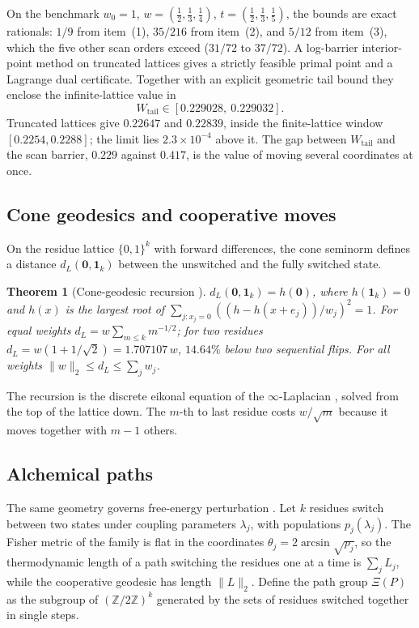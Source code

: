 \documentclass[11pt,reqno]{amsart}
\theoremstyle{plain}
\newtheorem{theorem}{Theorem}[section]
\theoremstyle{definition}
\theoremstyle{remark}
\numberwithin{equation}{section}
\newcommand{\Z}{\mathbb{Z}}
\newcommand{\Wtail}{W_{\mathrm{tail}}}
\begin{document}
On the benchmark $w_0=1$, $w=(\tfrac12,\tfrac13,\tfrac14)$, $t=(\tfrac12,\tfrac13,\tfrac15)$, the bounds are exact rationals: $1/9$ from item~(1), $35/216$ from item~(2), and $5/12$ from item~(3), which the five other scan orders exceed ($31/72$ to $37/72$). A log-barrier interior-point method on truncated lattices gives a strictly feasible primal point and a Lagrange dual certificate. Together with an explicit geometric tail bound they enclose the infinite-lattice value in
\[
\Wtail\in[0.229028,\ 0.229032].
\]
Truncated lattices give $0.22647$ and $0.22839$, inside the finite-lattice window $[0.2254,0.2288]$; the limit lies $2.3\times10^{-4}$ above it. The gap between $\Wtail$ and the scan barrier, $0.229$ against $0.417$, is the value of moving several coordinates at once.

\subsection*{Cone geodesics and cooperative moves}
On the residue lattice $\{0,1\}^k$ with forward differences, the cone seminorm defines a distance $d_L(\mathbf0,\mathbf1_k)$ between the unswitched and the fully switched state.

\begin{theorem}[Cone-geodesic recursion \cite{ChenChen2026VI}]\label{thm:cone}
$d_L(\mathbf0,\mathbf1_k)=h(\mathbf0)$, where $h(\mathbf1_k)=0$ and $h(x)$ is the largest root of $\sum_{j:x_j=0}((h-h(x+e_j))/w_j)^2=1$. For equal weights $d_L=w\sum_{m\le k}m^{-1/2}$; for two residues $d_L=w(1+1/\sqrt2)=1.707107\,w$, $14.64\%$ below two sequential flips. For all weights $\|w\|_2\le d_L\le\sum_jw_j$.
\end{theorem}

The recursion is the discrete eikonal equation of the $\infty$-Laplacian \cite{PSSW2009}, solved from the top of the lattice down. The $m$-th to last residue costs $w/\sqrt m$ because it moves together with $m-1$ others.

\subsection*{Alchemical paths}
The same geometry governs free-energy perturbation \cite{Zwanzig1954}. Let $k$ residues switch between two states under coupling parameters $\lambda_j$, with populations $p_j(\lambda_j)$. The Fisher metric of the family is flat in the coordinates $\theta_j=2\arcsin\sqrt{p_j}$, so the thermodynamic length \cite{Crooks2007,SivakCrooks2012} of a path switching the residues one at a time is $\sum_jL_j$, while the cooperative geodesic has length $\|L\|_2$. Define the path group $\Xi(P)$ as the subgroup of $(\Z/2\Z)^k$ generated by the sets of residues switched together in single steps.
\end{document}
